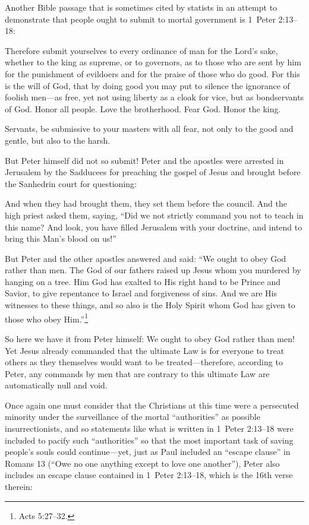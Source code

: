 \documentclass[letterpaper,12pt]{article}
\newenvironment{squotation}
  {\small\quotation}
  {\endquotation\normalsize}
\begin{document}
Another Bible passage that is sometimes cited by statists in an attempt to demonstrate that people ought to submit to mortal government is 1~Peter 2:13--18:

\begin{squotation}
Therefore submit yourselves to every ordinance of man for the Lord's sake, whether to the king as supreme, or to governors, as to those who are sent by him for the punishment of evildoers and for the praise of those who do good. For this is the will of God, that by doing good you may put to silence the ignorance of foolish men---as free, yet not using liberty as a cloak for vice, but as bondservants of God. Honor all people. Love the brotherhood. Fear God. Honor the king.

Servants, be submissive to your masters with all fear, not only to the good and gentle, but also to the harsh.
\end{squotation}

But Peter himself did not so submit! Peter and the apostles were arrested in Jerusalem by the Sadducees for preaching the gospel of Jesus and brought before the Sanhedrin court for questioning:

\begin{squotation}
And when they had brought them, they set them before the council. And the high priest asked them, saying, ``Did we not strictly command you not to teach in this name? And look, you have filled Jerusalem with your doctrine, and intend to bring this Man's blood on us!''

But Peter and the other apostles answered and said: ``We ought to obey God rather than men. The God of our fathers raised up Jesus whom you murdered by hanging on a tree. Him God has exalted to His right hand to be Prince and Savior, to give repentance to Israel and forgiveness of sins. And we are His witnesses to these things, and so also is the Holy Spirit whom God has given to those who obey Him.''\footnote{Acts 5:27--32.}
\end{squotation}

So here we have it from Peter himself: We ought to obey God rather than men! Yet Jesus already commanded that the ultimate Law is for everyone to treat others as they themselves would want to be treated---therefore, according to Peter, any commands by men that are contrary to this ultimate Law are automatically null and void.

Once again one must consider that the Christians at this time were a persecuted minority under the surveillance of the mortal ``authorities'' as possible insurrectionists, and so statements like what is written in 1~Peter 2:13--18 were included to pacify such ``authorities'' so that the most important task of saving people's souls could continue---yet, just as Paul included an ``escape clause'' in Romans 13 (``Owe no one anything except to love one another''), Peter also includes an escape clause contained in 1~Peter 2:13--18, which is the 16th verse therein:
\end{document}
